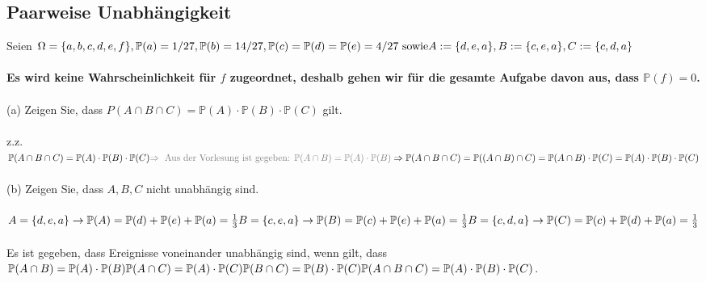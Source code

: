 \documentclass[a4paper]{article}
\begin{document}
\subsection{Paarweise Unabhängigkeit}
Seien \(\Omega=\{a,b,c,d,e,f\}, \mathbb{P} (a)=1/27, \mathbb{P}(b)=14/27, \mathbb{P}(c)= \mathbb{P}(d)= \mathbb{P}(e)=4/27 \text{ sowie}\\
A := \{d,e,a\}, B := \{c,e,a\}, C := \{c,d,a\}\)\\\\
\textbf{Es wird keine Wahrscheinlichkeit für $f$ zugeordnet, deshalb gehen wir für die gesamte Aufgabe davon aus, dass $\mathbb{P}(f)=0$.}\\\\
(a) Zeigen Sie, dass \(P(A \cap B \cap C) = \mathbb{P}(A) \cdot \mathbb{P}(B)\cdot \mathbb{P}(C)\) gilt.\\\\
z.z. \(\mathbb{P}(A \cap B \cap C) = \mathbb{P}(A) \cdot \mathbb{P}(B) \cdot \mathbb{P}(C)\\
\textcolor{gray}{\Rightarrow\text{ Aus der Vorlesung ist gegeben: } \mathbb{P}(A \cap B) = \mathbb{P}(A) \cdot \mathbb{P}(B)}\\
\Rightarrow \mathbb{P}(A \cap B \cap C) = \mathbb{P}((A \cap B)\cap C) = \mathbb{P}(A \cap B) \cdot \mathbb{P}(C) = \mathbb{P}(A) \cdot \mathbb{P}(B) \cdot \mathbb{P}(C)\)\\\\
(b) Zeigen Sie, dass $A, B, C$ nicht unabhängig sind.\\\\
\(A = \{d,e,a\} \rightarrow \mathbb{P}(A)=\mathbb{P}(d) + \mathbb{P}(e) + \mathbb{P}(a) = \frac{1}{3}\\
B= \{c,e,a\} \rightarrow \mathbb{P}(B) = \mathbb{P}(c) + \mathbb{P}(e) + \mathbb{P}(a) = \frac{1}{3}\\
B= \{c,d,a\} \rightarrow \mathbb{P}(C) =\mathbb{P}(c) + \mathbb{P}(d) + \mathbb{P}(a) = \frac{1}{3}\)\\\\
Es ist gegeben, dass Ereignisse voneinander unabhängig sind, wenn gilt, dass \\
\(\mathbb{P}(A \cap B) = \mathbb{P}(A) \cdot \mathbb{P}(B)\\
\mathbb{P}(A \cap C) = \mathbb{P}(A) \cdot \mathbb{P}(C)\\
\mathbb{P}(B \cap C) = \mathbb{P}(B) \cdot \mathbb{P}(C)\\
\mathbb{P}(A \cap B \cap C) = \mathbb{P}(A) \cdot \mathbb{P}(B) \cdot \mathbb{P}(C)\).\\\\
\end{document}
